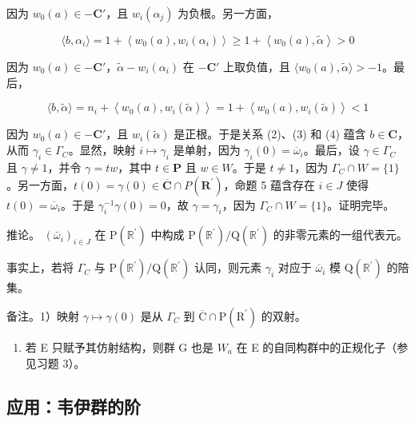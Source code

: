 因为 \(w_0(a) \in -\mathbf{C}'\)，且 \(w_i(\alpha_j)\) 为负根。另一方面，

\[
\langle b, \alpha_ {i} \rangle = 1 + \left\langle w _ {0} (a), w _ {i} (\alpha_ {i}) \right\rangle \geqslant 1 + \left\langle w _ {0} (a), \tilde {\alpha} \right\rangle > 0\tag{3}
\]

因为 \(w_0(a) \in -\mathbf{C}'\)，\(\tilde{\alpha} - w_i(\alpha_i)\) 在 \(-\mathbf{C}'\) 上取负值，且 \(\langle w_0(a), \tilde{\alpha} \rangle > -1\)。最后，

\[
\langle b, \tilde {\alpha} \rangle = n _ {i} + \left\langle w _ {0} (a), w _ {i} (\tilde {\alpha}) \right\rangle = 1 + \left\langle w _ {0} (a), w _ {i} (\tilde {\alpha}) \right\rangle <   1\tag{4}
\]

因为 \(w_0(a) \in -\mathbf{C}'\)，且 \(w_i(\tilde{\alpha})\) 是正根。于是关系 (2)、(3) 和 (4) 蕴含 \(b \in \mathbf{C}\)，从而 \(\gamma_i \in \Gamma_{C}\)。显然，映射 \(i \mapsto \gamma_i\) 是单射，因为 \(\gamma_i(0) = \overline{\omega}_i\)。最后，设 \(\gamma \in \Gamma_{C}\) 且 \(\gamma \neq 1\)，并令 \(\gamma = tw\)，其中 \(t \in \mathbf{P}\) 且 \(w \in W\)。于是 \(t \neq 1\)，因为 \(\Gamma_{C} \cap W = \{1\}\)。另一方面，\(t(0) = \gamma(0) \in \overline{\mathbf{C}} \cap P(\mathbf{R}^{\prime})\)，命题 5 蕴含存在 \(i \in J\) 使得 \(t(0) = \overline{\omega}_i\)。于是 \(\gamma_i^{-1}\gamma(0) = 0\)，故 \(\gamma = \gamma_i\)，因为 \(\Gamma_{C} \cap W = \{1\}\)。证明完毕。

推论。 \((\bar{\omega}_i)_{i\in J}\) 在 \(\mathrm{P}(\mathbb{R}^{\prime})\) 中构成 \(\mathrm{P}(\mathbb{R}^{\prime}) / \mathrm{Q}(\mathbb{R}^{\prime})\) 的非零元素的一组代表元。

事实上，若将 \(\Gamma_{C}\) 与 \(\mathrm{P}(\mathbb{R}^{\prime}) / \mathrm{Q}(\mathbb{R}^{\prime})\) 认同，则元素 \(\gamma_{i}\) 对应于 \(\overline{\omega}_{i}\) 模 \(\mathrm{Q}(\mathbb{R}^{\prime})\) 的陪集。

备注。1）映射 \(\gamma \mapsto \gamma(0)\) 是从 \(\Gamma_{C}\) 到 \(\overline{\mathrm{C}} \cap \mathrm{P}(\mathrm{R}^{\prime})\) 的双射。

\begin{enumerate}
\def\labelenumi{\arabic{enumi})}
\setcounter{enumi}{1}
\tightlist
\item
  若 E 只赋予其仿射结构，则群 G 也是 \(W_{a}\) 在 E 的自同构群中的正规化子（参见习题 3）。
\end{enumerate}

\subsection{应用：韦伊群的阶}

